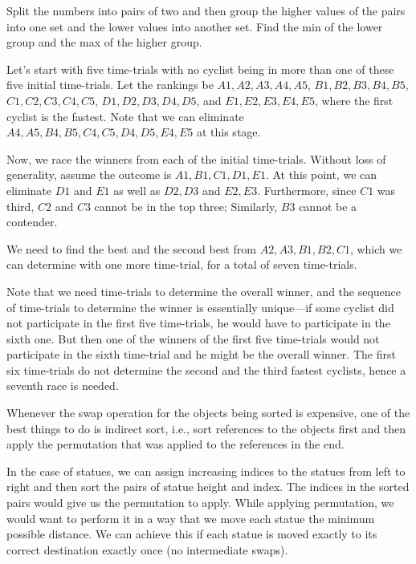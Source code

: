 Split the numbers into pairs of two and then group the higher values of
the pairs into one set and the lower values into another set.
 Find the min of the lower group and the max of
the higher group. 

Let's start with five time-trials with no cyclist being in more than one
of these five initial time-trials. Let the rankings be 
$A1,A2,A3,A4,A5$, $B1,B2,B3,B4,B5$,
$C1,C2,C3,C4,C5$, $D1,D2,D3,D4,D5$, and 
$E1,E2,E3,E4,E5$, where the first cyclist is the fastest.
Note that we can eliminate $A4,A5,B4,B5,C4,C5,D4,D5,E4,E5$ at this stage.

Now, we race the winners from each of
the initial time-trials. Without loss of generality, assume the outcome is $A1,B1,C1,D1,E1$.
At this point, we can eliminate $D1$ and $E1$ as well as $D2,D3$ and $E2,E3$.
Furthermore, since $C1$ was third, $C2$ and $C3$ cannot be in the top three;
Similarly, $B3$ cannot be a contender.

We need to find the best and the second best from $A2,A3,B1,B2,C1$, which we can determine with
one more time-trial, for a total of seven time-trials.


Note that we need time-trials to determine the overall winner, and the sequence of time-trials
to determine the winner is essentially unique---if some cyclist did not participate in the first
five time-trials, he would have to participate in the sixth one. But then one of the winners
of the first five time-trials would not participate in the sixth time-trial and he might 
be the overall winner.  The first six time-trials do not determine the second and the third fastest
cyclists, hence a seventh race is needed.


Whenever the swap operation for the objects being sorted is expensive, one of the best things to
do is indirect sort, i.e., sort references to the objects first and
then apply the permutation that was applied to the references in the
end. 

In the case of statues, we can assign increasing indices to the
statues from left to right and then sort the pairs of statue height
and index. The indices in the sorted pairs would give us the
permutation to apply.  While applying permutation, we would want to
perform it in a way that we move each statue the minimum possible
distance. We can achieve this if each statue is moved exactly to its
correct destination exactly once (no intermediate swaps). 

